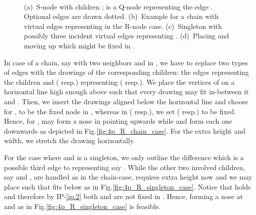 \documentclass[a4paper,twoside,11pt]{article}
\newcommand{\IPFix}{IP-\ref{ip:2}\xspace}
\begin{document}
\begin{description}
\begin{figure}[t]
    \centering
    \begin{minipage}[b]{.36\textwidth}
        \centering
    \end{minipage}\hspace{.13\textwidth}
    \begin{minipage}[b]{.36\textwidth}
        \centering
    \end{minipage}\\
    \begin{minipage}[b]{.36\textwidth}
        \centering
    \end{minipage}\hspace{.13\textwidth}
    \begin{minipage}[b]{.36\textwidth}
        \centering
    \end{minipage}
    \caption{
    (a)~S-node with children ;  is a Q-node representing the edge . Optional edges are drawn dotted.
    (b)~Example for a chain  with virtual edges representing  in the R-node case.
    (c)~Singleton  with possibly three incident virtual edges representing .
    (d)~Placing  and moving up  which might be fixed in .}
\end{figure}

In case of a chain, say  with two
neighbors  and  in , we have to replace two
types of edges with the drawings of the corresponding children: the
edges  representing the
children  and  ( resp.) representing  ( resp.). We place
the vertices of  on a horizontal line high enough above
 such that every drawing may fit in-between it and
. Then, we insert the drawings aligned below the horizontal
line and choose for ,  to be the fixed node in
, whereas in  ( resp.), we set 
( resp.) to be fixed. Hence, for ,  may
form a nose in  pointing upwards while  and
 form each one downwards as depicted in
Fig.\ref{fig:4p_R_chain_case}. For the extra height and width, we
stretch the drawing horizontally.

For the case where  and  is a singleton,
we only outline the difference which is a possible third edge  to  representing say . While the other two
involved children, say   and , are handled as in
the chain-case,  requires extra height now and we may
place  such that  fits below  as in
Fig.\ref{fig:4p_R_singleton_case}. Notice that  holds and therefore by \IPFix both  and  are not fixed
in . Hence, forming a nose at  and  as in
Fig.\ref{fig:4p_R_singleton_case} is feasible.


\end{description}
\end{document}
